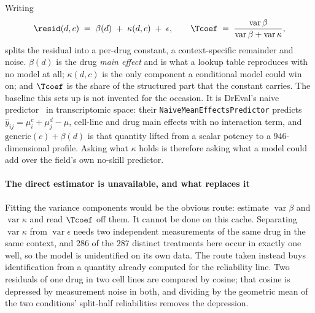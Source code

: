 Writing
\begin{equation}
 \resid(d,c) \;=\; \beta(d) \;+\; \kappa(d,c) \;+\; \epsilon,
 \qquad
 \Tcoef \;=\; \frac{\operatorname{var}\beta}{\operatorname{var}\beta + \operatorname{var}\kappa},
\end{equation}
splits the residual into a per-drug constant, a context-specific remainder and
noise. $\beta(d)$ is the drug \emph{main effect} and is what a lookup table
reproduces with no model at all; $\kappa(d,c)$ is the only component a conditional model could win
on; and $\Tcoef$ is the share of the structured part that the constant carries.
The baseline this sets up is not invented for the occasion. It is DrEval's naive
predictor~\cite{dreval} in transcriptomic space: their
\texttt{NaiveMeanEffectsPredictor} predicts $\hat{y}_{ij} = \mu^c_i + \mu^d_j -
\mu$, cell-line and drug main effects with no interaction term, and
$\textrm{generic}(c) + \beta(d)$ is that quantity lifted from a scalar potency to a
$946$-dimensional profile. Asking what $\kappa$ holds is therefore asking what a
model could add over the field's own no-skill predictor.

\paragraph{The direct estimator is unavailable, and what replaces it}
Fitting the variance components would be the obvious route: estimate
$\operatorname{var}\beta$ and $\operatorname{var}\kappa$ and read $\Tcoef$ off
them. It cannot be done on this cache. Separating $\operatorname{var}\kappa$ from
$\operatorname{var}\epsilon$ needs two independent measurements of the same drug in
the same context, and $\num{286}$ of the $\num{287}$ distinct treatments here occur
in exactly one well, so the model is unidentified on its own data. The route taken
instead buys identification from a quantity already computed for the reliability
line. Two residuals of one drug in two cell lines are compared by cosine; that
cosine is depressed by measurement noise in both, and dividing by the geometric
mean of the two conditions' split-half reliabilities removes the depression.


